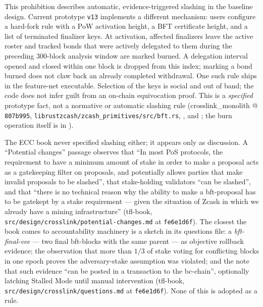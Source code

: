 \documentclass[11pt,a4paper]{article}
\theoremstyle{definition}
\begin{document}
This prohibition describes automatic, evidence-triggered slashing in the
baseline design. Current prototype \texttt{v13} implements a different
mechanism: users configure a hard-fork rule with a PoW activation height,
a BFT certificate height, and a list of terminated finalizer keys. At
activation, affected finalizers leave the active roster and tracked bonds
that were actively delegated to them during the preceding 300-block
analysis window are marked burned. A delegation interval opened and
closed within one block is dropped from this index; marking a bond
burned does not claw back an already completed withdrawal. One such rule
ships in the feature-net executable. Selection of
the keys is social and out of band; the code does not infer guilt from an
on-chain equivocation proof. This is a \emph{specified} prototype fact,
not a normative or automatic slashing rule
(crosslink\_monolith @ \texttt{807b995},
\texttt{librustzcash/zcash\_primitives/src/bft.rs},
, and
;
the burn operation itself is in
).

The ECC book never specified slashing either; it appears only as
discussion. A ``Potential changes'' passage observes that ``In most PoS
protocols, the requirement to have a minimum amount of stake in order to
make a proposal acts as a gatekeeping filter on proposals, and
potentially allows parties that make invalid proposals to be slashed'',
that stake-holding validators ``can be slashed'', and that ``there is no
technical reason why the ability to make a bft-proposal has to be
gatekept by a stake requirement --- given the situation of Zcash in which
we already have a mining infrastructure'' (tfl-book,
\texttt{src/design/crosslink/potential-changes.md} at \texttt{fe6e1d6f}).
The closest the book comes to accountability machinery is a sketch in its
questions file: a \emph{bft-final-vee} --- two final bft-blocks with the
same parent --- as objective rollback evidence; the observation that more
than $1/3$ of stake voting for conflicting blocks in one epoch proves the
adversary-stake assumption was violated; and the note that such evidence
``can be posted in a transaction to the bc-chain'', optionally latching
Stalled Mode until manual intervention (tfl-book,
\texttt{src/design/crosslink/questions.md} at \texttt{fe6e1d6f}). None of
this is adopted as a rule.
\end{document}
